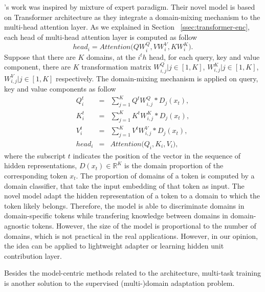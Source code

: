 \citet{Jiang20Multi}'s work was inspired by mixture of expert paradigm. Their novel model is based on Transformer architecture \citep{Vaswani17attention} as they integrate a domain-mixing mechanism to the multi-head attention layer. As we explained in Section ~\ref{ssec:transformer-enc}, each head of multi-head attention layer is computed as follow
\begin{equation}
head_i = Attention \big(QW_i^Q, VW_i^V, KW_i^K \big).
\end{equation}
Suppose that there are $K$ domains, at the $i^th$ head, for each query, key and value component, there are $K$ transformation matrix $W_{i,j}^Q | j \in [1,K]$, $W_{i,j}^K | j \in [1,K]$, $W_{i,j}^V | j \in [1,K]$ respectively. The domain-mixing mechanism is applied on query, key and value components as follow
\begin{equation}
\begin{array}{rcl}
Q_i^t &=& \sum_{j=1}^K Q^tW_{i,j}^Q*\mathit{D}_j(x_t),\\
K_i^t &=& \sum_{j=1}^K K^tW_{i,j}^K*\mathit{D}_j(x_t),\\
V_i^t &=& \sum_{j=1}^K V^tW_{i,j}^V*\mathit{D}_j(x_t),\\
head_i &=& Attention \big( Q_i, K_i, V_i\big),
\end{array}
\end{equation}
where the subscript $t$ indicates the position of the vector in the sequence of hidden representations, $\mathit{D}(x_t) \in \mathbb{R}^{K}$ is the domain proportion of the corresponding token $x_t$. The proportion of domains of a token is computed by a domain classifier, that take the input embedding of that token as input. The novel model adapt the hidden representation of a token to a domain to which the token likely belongs. Therefore, the model is able to discriminate domains in domain-specific tokens while transfering knowledge between domains in domain-agnostic tokens. However, the size of the model is proportional to the number of domains, which is not practical in the real applications. However, in our opinion, the idea can be applied to lightweight adapter or learning hidden unit contribution layer.

Besides the model-centric methods related to the architecture, multi-task training is another solution to the supervised (multi-)domain adaptation problem. 

